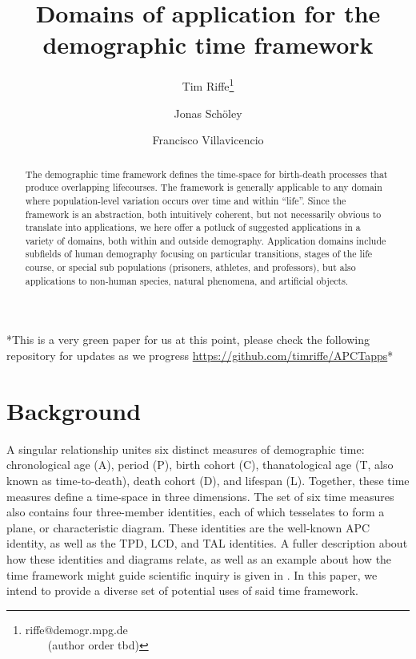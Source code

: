 \documentclass[11pt,oneside]{article} %
\begin{document}
\title{Domains of application for the demographic time framework}

\author[1]{Tim Riffe\thanks{riffe@demogr.mpg.de\\ ~~~~(author order tbd)}}
\author[2,3]{Jonas Sch{\"o}ley}
\author[2,3]{Francisco Villavicencio}


\maketitle


\begin{abstract}
The demographic time framework defines the time-space for birth-death processes
that produce overlapping lifecourses. The framework is generally applicable to
any domain where population-level variation occurs over time and within ``life''. Since the
framework is an abstraction, both intuitively coherent, but not
necessarily obvious to translate into applications, we here offer a potluck of
suggested applications in a variety of domains, both within and outside demography.
Application domains include subfields of human demography focusing on particular transitions, stages of the life course, or special sub populations (prisoners, athletes, and professors), but also applications to non-human species, natural phenomena, and artificial objects.
\end{abstract}

*This is a very green paper for us at this point, please check the following
repository for updates as we progress
\url{https://github.com/timriffe/APCTapps}*

\section*{Background}


A singular relationship unites six distinct measures of demographic time:
chronological age (A), period (P), birth cohort (C), thanatological age (T,
also known as time-to-death), death cohort (D), and lifespan (L). Together,
these time measures define a time-space in three dimensions. The set of six
time measures also contains four three-member identities, each of which
tesselates to form a plane, or characteristic diagram. These identities are the
well-known APC identity, as well as the TPD, LCD, and TAL identities. A
fuller description about how these identities and diagrams relate, as well as an
example about how the time framework might guide scientific inquiry is given in
\citet{rsv2015}. In this paper, we intend to provide a diverse set of potential
uses of said time framework.
\end{document}

